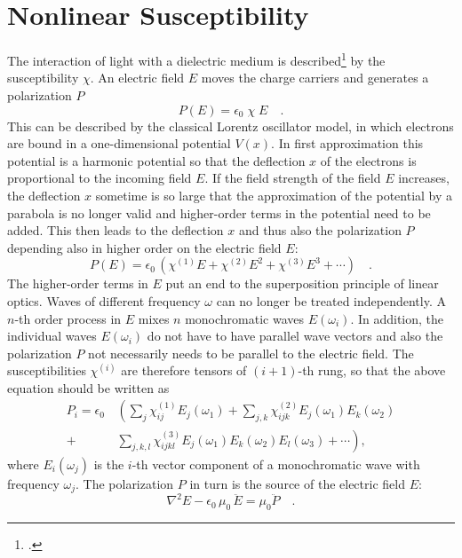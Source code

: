 \section{Nonlinear Susceptibility}

The interaction of light with a dielectric medium is described\footcite{MilonniEberly1988,Yariv1989} by the  susceptibility $\chi$.
An electric field $E$ moves the
charge carriers and generates a polarization $P$
\begin{equation}
  P(E) = \epsilon_0 \; \chi \; E \quad.
\end{equation}
This can be described by the classical Lorentz oscillator model,
in which electrons are bound  in a one-dimensional potential $V(x)$. In first approximation this potential is a
harmonic potential so that the deflection
$x$ of the electrons is proportional to the incoming field $E$.
If the field strength of the field $E$ increases, the deflection
$x$ sometime is so large that the approximation of the potential by a
parabola is no longer valid and higher-order terms in the
potential need to be added. This then leads to the deflection
$x$ and thus also the polarization $P$ depending also in higher
order  on the electric field $E$:
\begin{equation}
  P(E) = \epsilon_0 \, \left( \chi^{(1)} E + \chi^{(2)} E^2 + \chi^{(3)}
  E^3 + \cdots \right)  \quad .
\end{equation}
The higher-order terms in $E$  put an end to the 
superposition principle of linear optics. Waves of different
frequency $\omega$ can no longer be treated independently.
A $n$-th order process in $E$ mixes $n$ monochromatic
waves $E(\omega_i)$. In addition, the individual waves
$E(\omega_i)$ do not have to have parallel wave vectors and also the
polarization $P$ not necessarily needs to be parallel to the electric field. The susceptibilities $\chi^{(i)}$ are therefore tensors of
$(i+1)$-th rung, so that the above equation
 should be written as
\begin{align}
  P_i = \epsilon_0 \, & \left(  \sum_j \chi^{(1)}_{ij} E_j(\omega_1)
     + \sum_{j,k} \chi^{(2)}_{ijk} E_j(\omega_1) E_k(\omega_2)  \right. \nonumber \\+
     & \left.
    \sum_{j,k,l} \chi^{(3)}_{ijkl} E_j(\omega_1) E_k(\omega_2) E_l(\omega_3) + \cdots \right)  ,
\end{align}
where $E_i(\omega_j)$ is the $i$-th vector component of a
monochromatic wave with frequency $\omega_j$. The
polarization $P$ in turn is the source of the electric field $E$:
\begin{equation}
   \nabla^2 E - \epsilon_0 \, \mu_0 \, \ddot{E} = \mu_0 \ddot{P}  \quad .
   \label{eq_shg_wave equation}
\end{equation}

